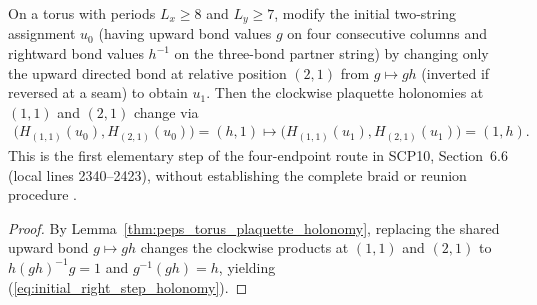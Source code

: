 \begin{lemma}
    \label{thm:peps_initial_string_right_step}
    \leanok
    On a torus with periods $L_x\ge 8$ and $L_y\ge 7$, modify the initial two-string assignment $u_0$ (having upward bond values $g$ on four consecutive columns and rightward bond values $h^{-1}$ on the three-bond partner string) by changing only the upward directed bond at relative position $(2,1)$ from $g\mapsto gh$ (inverted if reversed at a seam) to obtain $u_1$.
    Then the clockwise plaquette holonomies at $(1,1)$ and $(2,1)$ change via
    \begin{align}
        \bigl(H_{(1,1)}(u_0),H_{(2,1)}(u_0)\bigr)=(h,1) \longmapsto \bigl(H_{(1,1)}(u_1),H_{(2,1)}(u_1)\bigr)=(1,h). \label{eq:initial_right_step_holonomy}
    \end{align}
    This is the first elementary step of the four-endpoint route in SCP10, Section~6.6 (local lines 2340--2423), without establishing the complete braid or reunion procedure \cite{gap:rmp_peps_quantum_double_g_isometry}.
\end{lemma}
\begin{proof}\leanok
    By Lemma~\ref{thm:peps_torus_plaquette_holonomy}, replacing the shared upward bond $g\mapsto gh$ changes the clockwise products at $(1,1)$ and $(2,1)$ to $h(gh)^{-1}g=1$ and $g^{-1}(gh)=h$, yielding (\ref{eq:initial_right_step_holonomy}).
\end{proof}

